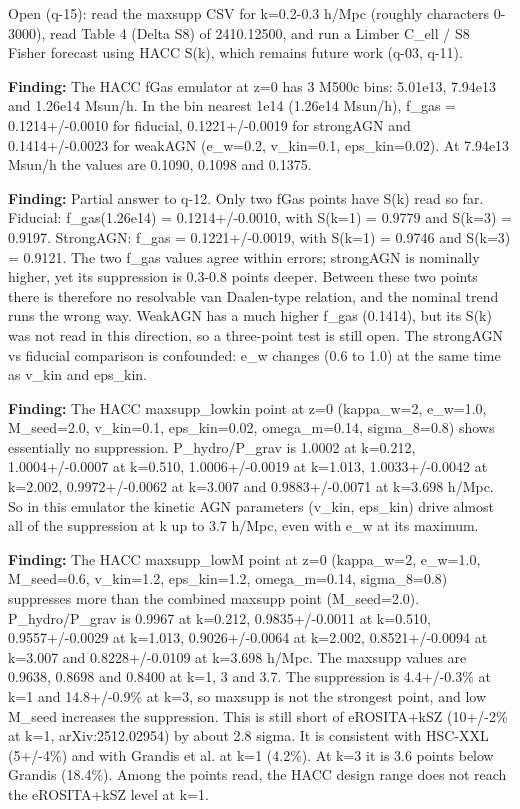 \documentclass[11pt,a4paper]{article}
\begin{document}
Open (q-15): read the maxsupp CSV for k=0.2-0.3 h/Mpc (roughly characters 0-3000), read Table 4 (Delta S8) of 2410.12500, and run a Limber C\_ell / S8 Fisher forecast using HACC S(k), which remains future work (q-03, q-11).

\textbf{Finding:} The HACC fGas emulator at z=0 has 3 M500c bins: 5.01e13, 7.94e13 and 1.26e14 Msun/h. In the bin nearest 1e14 (1.26e14 Msun/h), f\_gas = 0.1214+/-0.0010 for fiducial, 0.1221+/-0.0019 for strongAGN and 0.1414+/-0.0023 for weakAGN (e\_w=0.2, v\_kin=0.1, eps\_kin=0.02). At 7.94e13 Msun/h the values are 0.1090, 0.1098 and 0.1375.

\textbf{Finding:} Partial answer to q-12. Only two fGas points have S(k) read so far. Fiducial: f\_gas(1.26e14) = 0.1214+/-0.0010, with S(k=1) = 0.9779 and S(k=3) = 0.9197. StrongAGN: f\_gas = 0.1221+/-0.0019, with S(k=1) = 0.9746 and S(k=3) = 0.9121. The two f\_gas values agree within errors; strongAGN is nominally higher, yet its suppression is 0.3-0.8 points deeper. Between these two points there is therefore no resolvable van Daalen-type relation, and the nominal trend runs the wrong way. WeakAGN has a much higher f\_gas (0.1414), but its S(k) was not read in this direction, so a three-point test is still open. The strongAGN vs fiducial comparison is confounded: e\_w changes (0.6 to 1.0) at the same time as v\_kin and eps\_kin.

\textbf{Finding:} The HACC maxsupp\_lowkin point at z=0 (kappa\_w=2, e\_w=1.0, M\_seed=2.0, v\_kin=0.1, eps\_kin=0.02, omega\_m=0.14, sigma\_8=0.8) shows essentially no suppression. P\_hydro/P\_grav is 1.0002 at k=0.212, 1.0004+/-0.0007 at k=0.510, 1.0006+/-0.0019 at k=1.013, 1.0033+/-0.0042 at k=2.002, 0.9972+/-0.0062 at k=3.007 and 0.9883+/-0.0071 at k=3.698 h/Mpc. So in this emulator the kinetic AGN parameters (v\_kin, eps\_kin) drive almost all of the suppression at k up to 3.7 h/Mpc, even with e\_w at its maximum.

\textbf{Finding:} The HACC maxsupp\_lowM point at z=0 (kappa\_w=2, e\_w=1.0, M\_seed=0.6, v\_kin=1.2, eps\_kin=1.2, omega\_m=0.14, sigma\_8=0.8) suppresses more than the combined maxsupp point (M\_seed=2.0). P\_hydro/P\_grav is 0.9967 at k=0.212, 0.9835+/-0.0011 at k=0.510, 0.9557+/-0.0029 at k=1.013, 0.9026+/-0.0064 at k=2.002, 0.8521+/-0.0094 at k=3.007 and 0.8228+/-0.0109 at k=3.698 h/Mpc. The maxsupp values are 0.9638, 0.8698 and 0.8400 at k=1, 3 and 3.7. The suppression is 4.4+/-0.3\% at k=1 and 14.8+/-0.9\% at k=3, so maxsupp is not the strongest point, and low M\_seed increases the suppression. This is still short of eROSITA+kSZ (10+/-2\% at k=1, arXiv:2512.02954) by about 2.8 sigma. It is consistent with HSC-XXL (5+/-4\%) and with Grandis et al. at k=1 (4.2\%). At k=3 it is 3.6 points below Grandis (18.4\%). Among the points read, the HACC design range does not reach the eROSITA+kSZ level at k=1.
\end{document}
